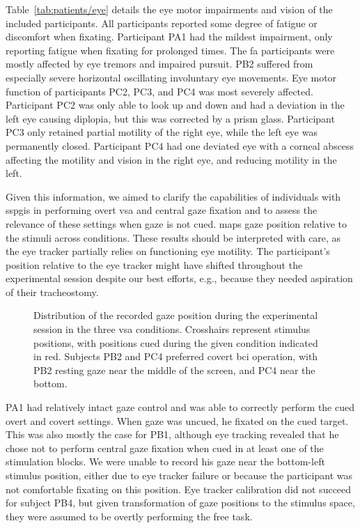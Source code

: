 \documentclass[twocolumn]{article}
\begin{document}
Table~\ref{tab:patients/eye} details the eye motor impairments and vision of
the included participants.
All participants reported some degree of fatigue or discomfort when fixating.
Participant PA1 had the mildest impairment, only reporting fatigue when fixating
for prolonged times.
The \ac{fa} participants were mostly affected by eye tremors and impaired pursuit.
PB2 suffered from especially severe horizontal oscillating involuntary eye
movements.
Eye motor function of participants PC2, PC3, and PC4 was most severely affected.
Participant PC2 was only able to look up and down and had a deviation in the
left eye causing diplopia, but this was corrected by a prism glass.
Participant PC3 only retained partial motility of the right eye, while the left eye was permanently closed.
Participant PC4 had one deviated eye with a corneal abscess affecting the motility
and vision in the right eye, and reducing motility in the left.


Given this information, we aimed to clarify the capabilities of individuals
with \acp{sspgi} in performing overt \ac{vsa} and central gaze fixation and to
assess the relevance of these settings when gaze is not cued.
 maps gaze position relative to the stimuli
across conditions.
These results should be interpreted with care, as the eye tracker partially
relies on functioning eye motility.
The participant's position relative to the eye tracker might have shifted
throughout the experimental session despite our best efforts, e.g., because they
needed aspiration of their tracheostomy.
\begin{figure}[t]
  \caption{%
    Distribution of the recorded gaze position during the experimental session in the three \ac{vsa}
    conditions.
    Crosshairs represent stimulus positions, with positions cued during
    the given condition indicated in red.
    Subjects PB2 and PC4 preferred covert \ac{bci} operation, with PB2 resting gaze
    near the middle of the screen, and PC4 near the bottom.
  }%
  \label{fig:patients/gaze}
\end{figure}

PA1 had relatively intact gaze control and was able to correctly perform the
cued overt and covert settings.
When gaze was uncued, he fixated on the cued target.
This was also mostly the case for PB1, although eye tracking revealed that he
chose not to perform central gaze fixation when cued in at least one of the
stimulation blocks. We were unable to record his gaze near the bottom-left
stimulus position, either due to eye tracker failure or because the participant
was not comfortable fixating on this position.
Eye tracker calibration did not succeed for subject PB4, but given
transformation of gaze positions to the stimulus space, they were assumed to
be overtly performing the free task.
\end{document}
